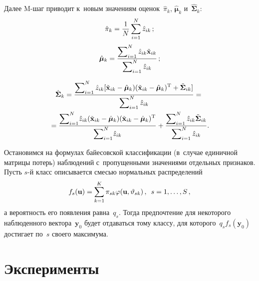 \begin{multicols}{2}
     Далее M-шаг приводит к~новым значениям оценок~$\hat{\pi}_k$, 
$\hat{\boldsymbol{\mu}}_k$ и~$\hat{\boldsymbol{\Sigma}}_k$:
     $$
     \hat{\pi}_k=\displaystyle\frac{\displaystyle 1\mathstrut}{\displaystyle N\mathstrut}\sum\limits_{i=1}^N \hat{z}_{ik}\,;
     $$
     $$
     \hat{\boldsymbol{\mu}}_k= \displaystyle\frac{\displaystyle \sum\nolimits_{i=1}^N 
\hat{z}_{ik}\tilde{\mathbf{x}}_{ik}\mathstrut}{\displaystyle \sum\nolimits^N_{i=1} \hat{z}_{ik}\mathstrut}\,;
     $$
     
\vspace*{-12pt}

\noindent
\begin{multline*}
     \hat{\boldsymbol{\Sigma}}_k = \displaystyle\frac{\displaystyle \sum\nolimits^N_{i=1}\hat{z}_{ik}[ 
\tilde{\mathbf{x}}_{ik} -\hat{\boldsymbol{\mu}}_k) (\tilde{\mathbf{x}}_{ik} - 
\hat{\boldsymbol{\mu}}_k)^{\mathrm{T}}+\tilde{\boldsymbol{\Sigma}}_{ik}]\mathstrut}{\displaystyle \sum\nolimits^N_{i=1}\hat{z}_{ik}\mathstrut} ={}\\
\hspace*{-2pt}{}=
     \displaystyle\frac{\displaystyle \sum\nolimits^N_{i=1}\! \hat{z}_{ik} (\tilde{\mathbf{x}}_{ik} - 
\hat{\boldsymbol{\mu}}_k) (\tilde{\mathbf{x}}_{ik}-
\hat{\boldsymbol{\mu}}_k)^{\mathrm{T}}\mathstrut}{\displaystyle \sum\nolimits^N_{i=1}\!\hat{z}_{ik}\mathstrut}+
     \displaystyle\frac{\displaystyle \sum\nolimits^N_{i=1} \hat{z}_{ik}\tilde{\boldsymbol{\Sigma}}_{ik}\mathstrut}{\displaystyle \sum\nolimits^N_{i=1}\hat{z}_{ik}\mathstrut}.\hspace*{-1.6729pt}
    \end{multline*}
     
     Остановимся на формулах байесовской классификации (в~случае 
единичной матрицы потерь) наблюдений с~пропущенными значениями 
отдельных признаков. Пусть $s$-й класс описывается смесью нормальных 
распределений 
     $$
     f_s(\mathbf{u})= \sum\limits_{k=1}^K 
\pi_{sk}\varphi(\mathbf{u},\vartheta_{sk})\,,\enskip 
s=1,\ldots ,S\,,
$$
 а вероятность его 
появления равна~$q_s$. Тогда предпочтение для некоторого наблюденного 
вектора~$\mathbf{y}_0$ будет отдаваться тому классу, для которого~$q_s 
f_s(\mathbf{y}_0)$ достигает по~$s$ своего максимума. 

\vspace*{-6pt}

\section{Эксперименты}

\vspace*{-2pt}
     

\end{multicols}
